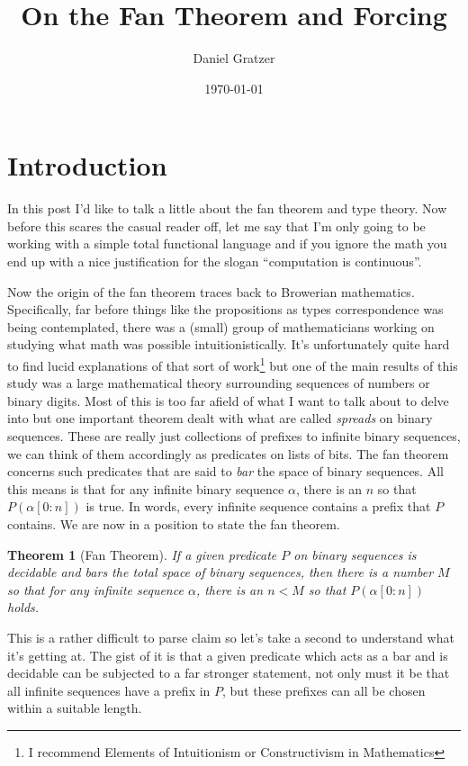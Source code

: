 \documentclass[12pt]{amsart}
\title{On the Fan Theorem and Forcing}
\author{Daniel Gratzer}
\date{\today}
\newtheorem{thm}{Theorem}[section]
\begin{document}
\maketitle

\section{Introduction}

In this post I'd like to talk a little about the fan theorem and type
theory. Now before this scares the casual reader off, let me say that
I'm only going to be working with a simple total functional language
and if you ignore the math you end up with a nice justification for
the slogan ``computation is continuous''.

Now the origin of the fan theorem traces back to Browerian
mathematics. Specifically, far before things like the propositions as
types correspondence was being contemplated, there was a (small) group
of mathematicians working on studying what math was possible
intuitionistically. It's unfortunately quite hard to find lucid
explanations of that sort of work\footnote{I recommend Elements of
  Intuitionism or Constructivism in Mathematics} but one of the main
results of this study was a large mathematical theory surrounding
sequences of numbers or binary digits. Most of this is too far afield
of what I want to talk about to delve into but one important theorem
dealt with what are called \emph{spreads} on binary sequences. These
are really just collections of prefixes to infinite binary sequences,
we can think of them accordingly as predicates on lists of bits. The
fan theorem concerns such predicates that are said to \emph{bar} the
space of binary sequences. All this means is that for any infinite
binary sequence $\alpha$, there is an $n$ so that $P(\alpha[0:n])$ is
true. In words, every infinite sequence contains a prefix that $P$
contains. We are now in a position to state the fan theorem.
\begin{thm}[Fan Theorem]\label{thm:intro:fan1}
  If a given predicate $P$ on binary sequences is \emph{decidable} and
  \emph{bars} the total space of binary sequences, then there is a
  number $M$ so that for any infinite sequence $\alpha$, there is an
  $n < M$ so that $P(\alpha[0:n])$ holds.
\end{thm}
This is a rather difficult to parse claim so let's take a second to
understand what it's getting at. The gist of it is that a given
predicate which acts as a bar and is decidable can be subjected to a
far stronger statement, not only must it be that all infinite
sequences have a prefix in $P$, but these prefixes can all be chosen
within a suitable length.
\end{document}
